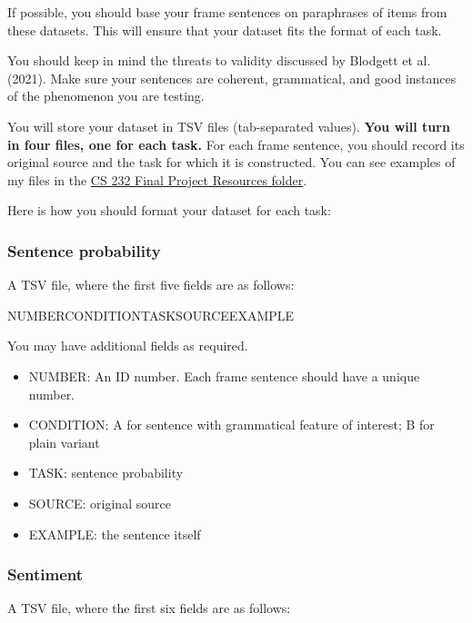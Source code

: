 \documentclass[12pt,table]{article}
\begin{document}
If possible, you should base your frame sentences on paraphrases of items from these datasets. This will ensure that your dataset fits the format of each task. 

You should keep in mind the threats to validity discussed by Blodgett et al. (2021). Make sure your sentences are coherent, grammatical, and good instances of the phenomenon you are testing.

You will store your dataset in TSV files (tab-separated values). \textbf{You will turn in four files, one for each task.} For each frame sentence, you should record its original source and the task for which it is constructed. You can see examples of my files in the \href{https://drive.google.com/drive/folders/1iHJ7GRd5YiAtT4NkOLBJKaMLCzLaElAD}{CS 232 Final Project Resources folder}.

Here is how you should format your dataset for each task:

\subsubsection*{Sentence probability}

A TSV file, where the first five fields are as follows:

NUMBER\hspace{5ex}CONDITION\hspace{5ex}TASK\hspace{5ex}SOURCE\hspace{5ex}EXAMPLE

You may have additional fields as required.

\begin{itemize}
\item NUMBER: An ID number. Each frame sentence should have a unique number.
\item CONDITION: A for sentence with grammatical feature of interest; B for plain variant
\item TASK: sentence probability
\item SOURCE: original source
\item EXAMPLE: the sentence itself
\end{itemize}

\subsubsection*{Sentiment}

A TSV file, where the first six fields are as follows:
\end{document}
